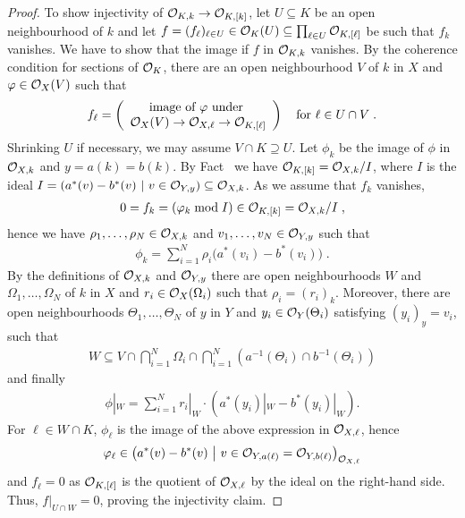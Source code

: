 \documentclass[a4paper,parskip=half,numbers=enddot, DIV=12]{scrreprt}
\begin{document}
\begin{proof}
    To show injectivity of $\Oo_{K,k}\morphism\Oo_{K,[k]}$, let $U\subseteq K$ be an open neighbourhood of $k$ and let $f= (f_\ell)_{\ell\in U} \in \mathcal{O}_K(U) \subseteq \prod_{\ell\in U} \mathcal{O}_{K,[\ell]}$ be such that $f_k$ vanishes. We have to show that the image if $f$ in $\mathcal{O}_{K,k}$ vanishes. By the coherence condition for sections of $\mathcal{O}_K$, there are an open neighbourhood $V$ of $k$ in $X$ and $\varphi\in \mathcal{O}_X(V)$ such that 
    \begin{align*}
    	f_\ell=\left(
    	\begin{array}{c}
	    	\text{image of }\phi\text{ under }\\
	    	\Oo_X(V) \morphism\Oo_{X,\ell} \morphism\Oo_{K,[\ell]} 
    	\end{array}\right)\quad\text{for }\ell\in U\cap V\;.
    \end{align*}
    Shrinking $U$ if necessary, we may assume $V\cap K \supseteq U$. Let $\phi_k$ be the image of $\phi$ in $\mathcal{O}_{X,k}$ and  $y=a(k)=b(k)$. By  Fact~ we have $\mathcal{O}_{K,[k]}=\mathcal{O}_{X,k}/I$, where $I$ is the ideal $I=\left(a^*(v)-b^*(v)\ \middle|\  v\in \mathcal{O}_{Y,y}\right)\subseteq\mathcal{O}_{X,k}$. As we assume that $f_k$ vanishes,
    \begin{align*}
    	0 = f_k=(\varphi_k\bmod I)\in\mathcal{O}_{K,[k]}=\mathcal{O}_{X,k}/I\;, 
    \end{align*}
    hence we have $\rho_1,\ldots,\rho_N\in \mathcal{O}_{X,k}$ and $v_1,\ldots,v_N\in \mathcal{O}_{Y,y}$ such that
    \begin{align*}
        \phi_k = \sum_{i=1}^N \rho_i\big(a^*(v_i) -b^*(v_i)\big)\;.
    \end{align*}
    By the definitions of $\mathcal{O}_{X,k}$ and $\mathcal{O}_{Y,y}$ there are open neighbourhoods $W$ and $\Omega_1,\ldots,\Omega_N$ of $k$ in $X$ and $r_i \in \mathcal{O}_X(\Omega_i)$ such that $\rho_i = (r_i)_k$. Moreover, there are open neighbourhoods $\Theta_1,\ldots,\Theta_N$ of $y$ in $Y$ and $y_i \in \mathcal{O}_Y(\Theta_i)$ satisfying $(y_i)_y = v_i$, such that 
    \begin{align*}
        W\subseteq V\cap \bigcap_{i=1}^N \Omega_i \cap\bigcap_{i=1}^N \left(a^{-1}(\Theta_i) \cap b^{-1}(\Theta_i)\right)
    \end{align*}
    and finally
    \begin{align*}
        \phi|_W = \sum_{i=1}^N r_i|_W \cdot \left(a^*(y_i)|_W -b^*(y_i)|_W\right).
    \end{align*}
    For $\ell\in W\cap K$, $\phi_\ell$ is the image of the above expression in $\mathcal{O}_{X,\ell}$, hence 
    \begin{align*}
        \varphi_\ell\in \left(a^*(v) -b^*(v)\ \middle|\  v\in \mathcal{O}_{Y,a(\ell)} = \mathcal{O}_{Y,b(\ell)}\right)_{\mathcal{O}_{X,\ell}}
    \end{align*}
    and $f_\ell =0$ as $\mathcal{O}_{K,[\ell]}$ is the quotient of $\mathcal{O}_{X,\ell}$ by the ideal on the right-hand side. Thus, $f|_{U\cap W} =0$, proving the injectivity claim.
	

\end{proof}
\end{document}
